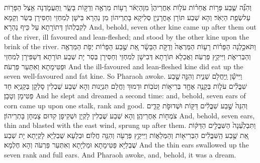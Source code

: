 {וְהִנֵּ֞ה שֶׁ֧בַע פָּר֣וֹת אֲחֵר֗וֹת עֹל֤וֹת אַחֲרֵיהֶן֙ מִן\maqqaf הַיְאֹ֔ר רָע֥וֹת מַרְאֶ֖ה וְדַקּ֣וֹת בָּשָׂ֑ר וַֽתַּעֲמֹ֛דְנָה אֵ֥צֶל הַפָּר֖וֹת עַל\maqqaf שְׂפַ֥ת הַיְאֹֽר׃}
{וְהָא שְׁבַע תּוֹרָן אָחֳרָנְיָן סְלִיקָא בָּתְרֵיהוֹן מִן נַהְרָא בִּישָׁן לְמִחְזֵי וְחַסִּירָן בְּשַׂר וְקַמָא לְקִבְלְהוֹן דְּתוֹרָתָא עַל כֵּיף נַהְרָא׃}
{And, behold, seven other kine came up after them out of the river, ill favoured and lean-fleshed; and stood by the other kine upon the brink of the river.}{}
{וַתֹּאכַ֣לְנָה הַפָּר֗וֹת רָע֤וֹת הַמַּרְאֶה֙ וְדַקֹּ֣ת הַבָּשָׂ֔ר אֵ֚ת שֶׁ֣בַע הַפָּר֔וֹת יְפֹ֥ת הַמַּרְאֶ֖ה וְהַבְּרִיאֹ֑ת וַיִּיקַ֖ץ פַּרְעֹֽה׃}
{וַאֲכַלָא תּוֹרָתָא דְּבִישָׁן לְמִחְזֵי וְחַסִּירָן בְּסַר יָת שְׁבַע תּוֹרָתָא דְּשַׁפִּירָן לְמִחְזֵי וּפַטִּימָתָא וְאִתְּעַר פַּרְעֹה׃}
{And the ill-favoured and lean-fleshed kine did eat up the seven well-favoured and fat kine. So Pharaoh awoke.}{}
{וַיִּישָׁ֕ן וַֽיַּחֲלֹ֖ם שֵׁנִ֑ית וְהִנֵּ֣ה \legarmeh  שֶׁ֣בַע שִׁבֳּלִ֗ים עֹל֛וֹת בְּקָנֶ֥ה אֶחָ֖ד בְּרִיא֥וֹת וְטֹבֽוֹת׃}
{וּדְמוּךְ וַחֲלַם תִּנְיָנוּת וְהָא שְׁבַע שֻׁבְלִין סָלְקָן בְּקַנְיָא חַד פַּטִּימָן וְטָבָן׃}
{And he slept and dreamed a second time: and, behold, seven ears of corn came up upon one stalk, rank and good.}{}
{וְהִנֵּה֙ שֶׁ֣בַע שִׁבֳּלִ֔ים דַּקּ֖וֹת וּשְׁדוּפֹ֣ת קָדִ֑ים צֹמְח֖וֹת אַחֲרֵיהֶֽן׃}
{וְהָא שְׁבַע שֻׁבְלִין לָקְיָן וּשְׁקִיפָן קִדּוּם צָמְחָן בָּתְרֵיהוֹן׃}
{And, behold, seven ears, thin and blasted with the east wind, sprung up after them.}{}
{וַתִּבְלַ֙עְנָה֙ הַשִּׁבֳּלִ֣ים הַדַּקּ֔וֹת אֵ֚ת שֶׁ֣בַע הַֽשִּׁבֳּלִ֔ים הַבְּרִיא֖וֹת וְהַמְּלֵא֑וֹת וַיִּיקַ֥ץ פַּרְעֹ֖ה וְהִנֵּ֥ה חֲלֽוֹם׃}
{וּבְלַעָא שֻׁבְלַיָּא לָקְיָתָא יָת שְׁבַע שֻׁבְלַיָּא פַּטִּימָתָא וּמַלְיָתָא וְאִתְּעַר פַּרְעֹה וְהָא חֶלְמָא׃}
{And the thin ears swallowed up the seven rank and full ears. And Pharaoh awoke, and, behold, it was a dream.}{}
